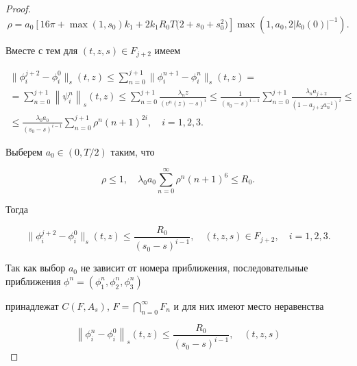\begin{proof}
\[\rho  = {a_0}\left[ {16\pi  + \max (1,{s_0})}\right.{k_1} + 2{k_1}{R_0}T(2 + {s_0} + \left. {s_0^2)} \right]\max (1,{a_0},2{\left| {{k_0}(0)} \right|^{-1}}).\]

Вместе с тем для $(t, z, s)  \in {F_{j + 2}}$ имеем

\begin{multline*}

\| {\phi _i^{j + 2} - \phi _i^0} \|_s(t,z) \leqslant \sum\limits_{n = 0}^{j + 1}   \| {\phi _i^{n + 1} - \phi _i^n} \|_s

(t,z) = 

\\

=\sum\limits_{n = 0}^{j + 1} {{{\left\| {\psi _i^n} \right\|}_s}} (t,z) \leqslant \sum\limits_{n = 0}^{j + 1} {\frac{{{\lambda _n}z}}{{{{\left(

{{v^n}(z) - s} \right)}^i}}}}  %


\leqslant \frac{1}{{{{\left( {{s_0} - s} \right)}^{i - 1}}}}\sum\limits_{n = 0}^{j + 1}

{\frac{{{\lambda _n}{a_{j + 2}}}}{{{{\left( {1 - {a_{j + 2}}a_n^{ - 1}} \right)}^i}}}}  \leqslant

\\

 \leqslant\frac{{{\lambda _0}{a_0}}}{{{{\left( {{s_0} - s}

 \right)}^{i - 1}}}}\sum\limits_{n = 0}^{j + 1} {{\rho ^n}} {(n + 1)^{2i}},\quad  i = 1, 2, 3.

\end{multline*} 

Выберем ${a_0} \in ( 0, {T}/{2})$ таким, что

\[\rho  \leqslant 1, \quad {\lambda _0}{a_0}\sum\limits_{n = 0}^\infty  {{\rho ^n}} {(n + 1)^6} \leqslant {R_0}.\]

Тогда  

$$\| {\phi _i^{j + 2} - \phi _i^0} \|_s(t,z) \leqslant \frac{{{R_0}}}{(s_0 - s)^{i - 1}},\quad 

(t, z, s)  \in {F_{j + 2}}, \quad  i = 1, 2, 3.$$

Так как выбор $a_0$ не зависит от номера приближения, последовательные приближения ${\phi ^n} = (\phi _1^n,\phi _2^n,\phi _3^n)$

принадлежат  $C(F,{A_s})$,     $F = \bigcap_{n = 0}^\infty  {{F_n}} $ и для них имеют место неравенства

\[{\left\| {\phi _i^n - \phi _i^0} \right\|_s}(t,z) \leqslant \frac{{{R_0}}}{{{{({s_0} - s)}^{i - 1}}}}, \quad  (t, z, s) 

\]
\end{proof}

